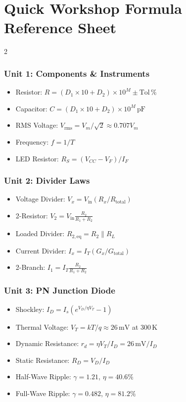 \chapter*{Quick Workshop Formula Reference Sheet}

\begin{multicols}{2}
\subsection*{Unit 1: Components \& Instruments}
\begin{itemize}
    \item Resistor: $R = (D_1 \times 10 + D_2) \times 10^M \pm \text{Tol}\,\%$
    \item Capacitor: $C = (D_1 \times 10 + D_2) \times 10^M\,\mathrm{pF}$
    \item RMS Voltage: $V_{\mathrm{rms}} = V_m / \sqrt{2} \approx 0.707 V_m$
    \item Frequency: $f = 1 / T$
    \item LED Resistor: $R_S = (V_{CC} - V_F) / I_F$
\end{itemize}

\subsection*{Unit 2: Divider Laws}
\begin{itemize}
    \item Voltage Divider: $V_x = V_{\mathrm{in}} (R_x / R_{\mathrm{total}})$
    \item 2-Resistor: $V_2 = V_{\mathrm{in}} \frac{R_2}{R_1 + R_2}$
    \item Loaded Divider: $R_{2,\mathrm{eq}} = R_2 \parallel R_L$
    \item Current Divider: $I_x = I_T (G_x / G_{\mathrm{total}})$
    \item 2-Branch: $I_1 = I_T \frac{R_2}{R_1 + R_2}$
\end{itemize}

\subsection*{Unit 3: PN Junction Diode}
\begin{itemize}
    \item Shockley: $I_D = I_s (e^{V_D / \eta V_T} - 1)$
    \item Thermal Voltage: $V_T = kT/q \approx 26\,\mathrm{mV}$ at $300\,\mathrm{K}$
    \item Dynamic Resistance: $r_d = \eta V_T / I_D = 26\,\mathrm{mV} / I_D$
    \item Static Resistance: $R_D = V_D / I_D$
    \item Half-Wave Ripple: $\gamma = 1.21$, $\eta = 40.6\%$
    \item Full-Wave Ripple: $\gamma = 0.482$, $\eta = 81.2\%$
\end{itemize}


\end{multicols}
